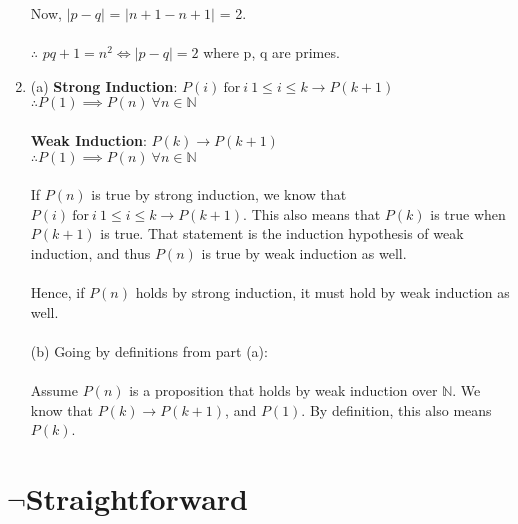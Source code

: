 \documentclass[a4paper]{article}
\begin{document}
\begin{enumerate}
    Now, $|p-q|$ = $|n+1 - n+1|$ = 2. \\
    \\
    $\therefore$ $pq + 1 = n^2 \Leftrightarrow |p-q| = 2$ where p, q are primes. \\

    \item (a) \textbf{Strong Induction}: $P(i)\ \text{for}\ i\ 1 \leq i \leq k \rightarrow P(k + 1)$\\
    $\therefore P(1) \implies P(n)\ \forall n \in \mathbb{N}$  \\
    \\
    \textbf{Weak Induction}: $P(k) \rightarrow P(k + 1)$  \\
    $\therefore P(1) \implies P(n)\ \forall n \in \mathbb{N}$  \\
    \\
    If $P(n)$ is true by strong induction, we know that $P(i)\ \text{for}\ i\ 1 \leq i \leq k \rightarrow P(k + 1)$. This also means that $P(k)$ is true when $P(k+1)$ is true. That statement is the induction hypothesis of weak induction, and thus $P(n)$ is true by weak induction as well. \\
    \\
    Hence, if $P(n)$ holds by strong induction, it must hold by weak induction as well.\\ 
    \\
    (b) Going by definitions from part (a):\\
    \\
    Assume $P(n)$ is a proposition that holds by weak induction over $\mathbb{N}$. We know that $P(k) \rightarrow P(k + 1)$, and $P(1)$. By definition, this also means $P(k)$. \\ 

    

    
\end{enumerate}


\section{$\neg$Straightforward}
\end{document}
